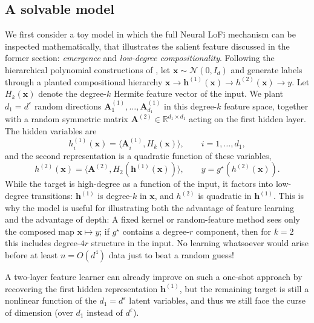 \subsection{A solvable model}
\label{2605:sec:the model}
We first consider a toy model in which the full Neural LoFi mechanism can be inspected mathematically, that illustrates the salient feature discussed in the former section: {\it emergence} and {\it low-degree compositionality}. Following the hierarchical polynomial constructions of
\cite{nichani2023provable,wang2024learning,fu2025learning,tabanelli2026deep}, let $\bm x\sim \mathcal N(0,I_d)$ and generate labels through a planted compositional hierarchy
$
\bm x
 \longrightarrow 
\bm h^{(1)}(\bm x)
 \longrightarrow 
h^{(2)}(\bm x)
 \longrightarrow 
y$. Let $H_k(\bm x)$ denote the degree-$k$ Hermite feature vector of the input. We plant $d_1=d^\varepsilon$ random directions
$\bm A_1^{(1)},\ldots,\bm A_{d_1}^{(1)}$ in this degree-$k$ feature space, together with a random symmetric matrix
$\bm A^{(2)}\in\mathbb R^{d_1\times d_1}$ acting on the first hidden layer. The hidden variables are
\begin{equation}
    h_i^{(1)}(\bm x)
    =
    \big\langle \bm A_i^{(1)}, H_k(\bm x)\big\rangle,
    \qquad i=1,\ldots,d_1,
\end{equation}
and the second representation is a quadratic function of these variables,
\begin{equation}
    h^{(2)}(\bm x)
    =
    \big\langle \bm A^{(2)}, H_2(\bm h^{(1)}(\bm x))\big\rangle,
    \qquad
    y = g^\star(h^{(2)}(\bm x)).\label{2605:model}
\end{equation}
While the target is high-degree as a function of the input, it factors into low-degree transitions: $\bm h^{(1)}$ is degree-$k$ in $\bm x$, and $h^{(2)}$ is quadratic in $\bm h^{(1)}$. This is why the model is useful for illustrating both the advantage of feature learning and the advantage of depth: A fixed kernel or random-feature method \cite{mei2022generalizationerror} sees only the composed map $\bm x\mapsto y$; if $g^\star$ contains a degree-$r$ component, then for $k=2$ this includes degree-$4r$ structure in the input. No learning whatsoever would arise before at least $n=O(d^4)$ data just to beat a random guess!

A two-layer feature learner can already improve on such a one-shot approach by recovering the first hidden representation $\bm h^{(1)}$, but the remaining target is still a nonlinear function of the $d_1=d^\varepsilon$ latent variables, and thus we still face the curse of dimension (over $d_1$ instead of $d^\varepsilon$).

